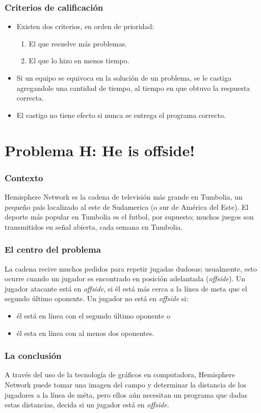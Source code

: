 \documentclass{beamer}
\begin{document}
\begin{frame}
 \frametitle{Criterios de calificación}
 \begin{itemize}
  \item Existen dos criterios, en orden de prioridad:
  \begin{enumerate}
   \item El que resuelve más problemas.
   \item El que lo hizo en menos tiempo.
  \end{enumerate}
  \item Si un equipo se equivoca en la solución de un problema, se le castiga agregandole una cantidad de tiempo, al tiempo en que obtuvo la respuesta correcta.
  \item El castigo no tiene efecto si nunca se entrega el programa correcto.
 \end{itemize}

\end{frame}

\section{Problema H: He is offside!}
\begin{frame}
 \frametitle{Contexto}
 Hemisphere Network es la cadena de televisión más grande en Tumbolia, un pequeño país localizado al este de Sudamerica (o sur de América del Este). El deporte más popular en Tumbolia es el futbol, por supuesto; muchos juegos son transmitidos en señal abierta, cada semana en Tumbolia.
\end{frame}

\begin{frame}
 \frametitle{El centro del problema}
 La cadena recive muchos pedidos para repetir jugadas dudosas; usualmente, esto ocurre cuando un jugador es encontrado en posición adelantada (\emph{offside}). Un jugador atacante está en \emph{offside}, si él está más cerca a la línea de meta que el segundo último oponente. Un jugador no está en \emph{offside} si:
 \begin{itemize}
  \item él está en línea con el segundo último oponente o
  \item él esta en línea con al menos dos oponentes.
 \end{itemize}
\end{frame}

\begin{frame}
 \frametitle{La conclusión}
 A través del uso de la tecnología de gráficos en computadora, Hemisphere Network puede tomar una imagen del campo y determinar la distancia de los jugadores a la línea de méta, pero ellos aún necesitan un programa que dadas estas distancias, decida si un jugador está en \emph{offside}.
\end{frame}
\end{document}
